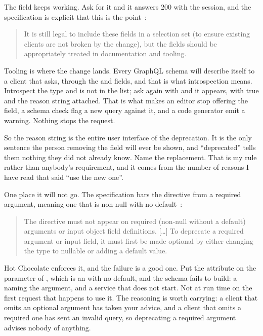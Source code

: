 %
The field keeps working. Ask for it and it answers 200 with the session, and
the specification is explicit that this is the
point~\autocite{graphqlspec2025}:

\begin{quote}
It is still legal to include these fields in a selection set (to ensure
existing clients are not broken by the change), but the fields should be
appropriately treated in documentation and tooling.
\end{quote}

%
%
Tooling is where the change lands. Every GraphQL schema will describe itself
to a client that asks, through the  and 
fields, and that is what introspection means. Introspect the 
type and  is not in the list; ask again with
 and it appears, with
 true and the reason string attached. That is what makes an
editor stop offering the field, a schema check flag a new query against it, and
a code generator emit a warning. Nothing stops the request.

%
So the reason string is the entire user interface of the deprecation. It is
the only sentence the person removing the field will ever be shown, and
\enquote{deprecated} tells them nothing they did not already know. Name the
replacement. That is my rule rather than anybody's requirement, and it comes
from the number of reasons I have read that said \enquote{use the new one}.

%
One place it will not go. The specification bars the directive from a required
argument, meaning one that is non-null with no
default~\autocite{graphqlspec2025}:

\begin{quote}
The  directive must not appear on required (non-null without
a default) arguments or input object field definitions. [\ldots] To deprecate a
required argument or input field, it must first be made optional by either
changing the type to nullable or adding a default value.
\end{quote}

%
Hot Chocolate enforces it, and the failure is a good one. Put the attribute on
the  parameter of , which is an  with no
default, and the schema fails to build: a  naming the
argument, and a service that does not start. Not at run time on the first
request that happens to use it. The reasoning is worth carrying: a client
that omits an optional argument has taken your advice, and a client that omits
a required one has sent an invalid query, so deprecating a required argument
advises nobody of anything.

